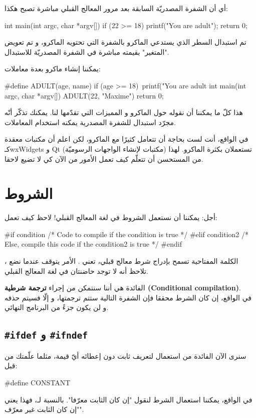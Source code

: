 أي أن الشفرة المصدريّة السابقة بعد مرور المعالج القبلي مباشرة تصبح هكذا:
\begin{Csource}
int main(int argc, char *argv[])
{
	if (22 >= 18)
		printf("You are adult\n");
	return 0;
}
\end{Csource}
تم استبدال السطر الذي يستدعي الماكرو بالشفرة التي تحتويه الماكرو، و تم تعويض "المتغير"
بقيمته مباشرة في الشفرة المصدريّة للاستبدال.

يمكننا إنشاء ماكرو بعدة معاملات:
\begin{Csource}
#define ADULT(age, name) if (age >= 18)\
			printf("You are adult %
int main(int argc, char *argv[])
{
	ADULT(22, "Maxime")
	return 0;
}
\end{Csource}
هذا كلّ ما يمكننا أن نقوله حول الماكرو و المميزات التي تقدّمها لنا. يمكنك تذكّر أنّه مجرّد استبدال للشفرة المصدرية يمكنه استخدام المعاملات.
\begin{information}
في الواقع، أنت لست بحاجة أن تتعامل كثيرًا مع الماكرو، لكن اعلم أن مكتبات معقدة كـ\textenglish{wxWidgets}
و \textenglish{Qt}
(مكتبات لإنشاء الواجهات الرسوميّة) تستعملان بكثرة الماكرو. لهذا من المستحسن أن تتعلّم كيف تعمل الأمور من الآن كي لا تضيع لاحقا.
\end{information}

\section{الشروط}
أجل: يمكننا أن نستعمل الشروط في لغة المعالج القبلي! لاحظ كيف تعمل:
\begin{Csource}
#if condition
  /* Code to compile if the condition is true */
#elif condition2
  /* Else, compile this code if the condition2 is true */
#endif
\end{Csource}
الكلمة المفتاحية
تسمح بإدراج شرط معالج قبلي،
تعني
.
الأمر يتوقف عندما نضع
،
تلاحظ أنه لا توجد حاضنتان في لغة المعالج القبلي.

الفائدة هي أننا سنتمكن من إجراء
\textbf{ترجمة شرطية
(\textenglish{Conditional compilation})}.\\
في الواقع، إن كان الشرط محققا فإن الشفرة التالية ستتم ترجمتها، و إلّا فسيتم حذفه و لن يكون جزءً من البرنامج النهائي.

\subsection{
\texttt{\#ifdef}
و
\texttt{\#ifndef}
}
سنرى الآن الفائدة من استعمال
لتعريف ثابت دون إعطائه أيّ قيمة، مثلما علّمتك من قبل:
\begin{Csource}
#define CONSTANT
\end{Csource}
في الواقع، يمكننا استعمال الشرط
لنقول "إن كان الثابت معرّفا".
بالنسبة لـ،
فهذا يعني "إن كان الثابت غير معرّف".

